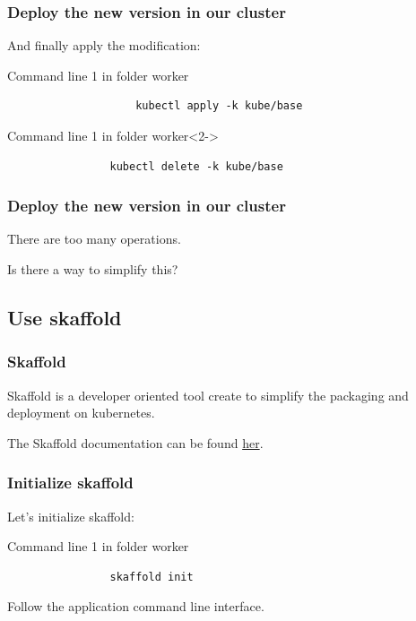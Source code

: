 	\begin{frame}[fragile]
		\frametitle{Deploy the new version in our cluster}
			
		And finally apply the modification:
		\begin{block}{Command line 1 in folder worker}
			\begin{small}
					\begin{verbatim}
					kubectl apply -k kube/base
				\end{verbatim}
			\end{small}
		\end{block}
		
		\bigskip
		
		\begin{block}{Command line 1 in folder worker}<2->
			\begin{verbatim}
				kubectl delete -k kube/base
			\end{verbatim}
		\end{block}
	\end{frame}
	
	\begin{frame}
		\frametitle{Deploy the new version in our cluster}
		
		There are too many operations.
		
		\bigskip
		Is there a way to simplify this?
	\end{frame}
	
\subsection{Use skaffold}	
	
	\begin{frame}
		\frametitle{Skaffold}
		
		Skaffold is a developer oriented tool create to simplify the packaging and deployment on kubernetes.
		
		\medskip
		The Skaffold documentation can be found \href{https://github.com/GoogleContainerTools/skaffold}{her}.

	\end{frame}
	
	\begin{frame}[fragile]
		\frametitle{Initialize skaffold}
		
		Let's initialize skaffold:
		\begin{block}{Command line 1 in folder worker}
			\begin{verbatim}
				skaffold init
			\end{verbatim}
			Follow the application command line interface.
		\end{block}
	\end{frame}
	
